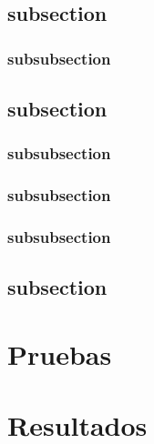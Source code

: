 \documentclass{beamer}
\begin{document}
  \subsection{subsection}
    \subsubsection{subsubsection}
  \subsection{subsection}
    \subsubsection{subsubsection}
    \subsubsection{subsubsection}
    \subsubsection{subsubsection}
  \subsection{subsection}

\section{Pruebas}
\section{Resultados}
\end{document}
